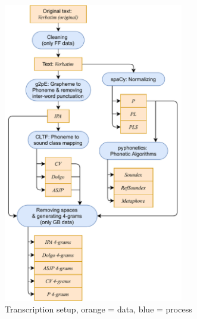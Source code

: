 \begin{figure}
  \centering
  \includegraphics[width=0.7\textwidth]{figures/transcription}
  \caption{Transcription setup, orange = data, blue = process}
  \label{fig:transcription}
\end{figure}


